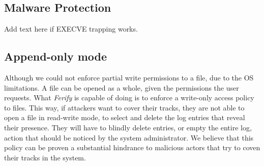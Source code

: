 %
%
%

\subsection{Malware Protection}

Add text here if EXECVE trapping works.

\subsection{Append-only mode}

\par Although we could not enforce partial write permissions to a file, due to the \ac{OS} limitations. A file can be opened as a whole, given the permissions the user requests. What \emph{Ferify} is capable of doing is to enforce a write-only access policy to files. This way, if attackers want to cover their tracks, they are not able to open a file in read-write mode, to select and delete the log entries that reveal their presence. They will have to blindly delete entries, or empty the entire log, action that should be noticed by the system administrator. We believe that this policy can be proven a substantial hindrance to malicious actors that try to coven their tracks in the system.

